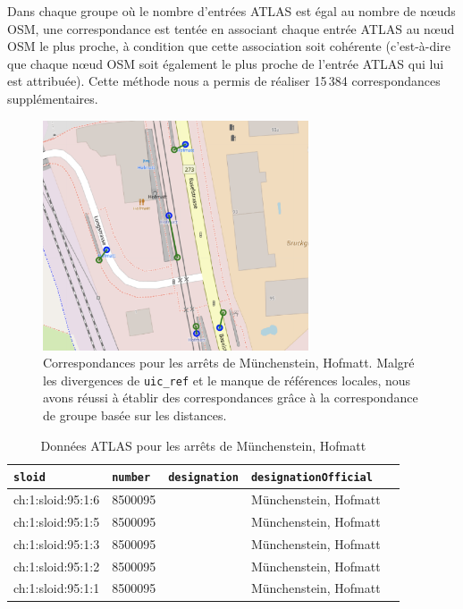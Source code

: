 Dans chaque groupe où le nombre d'entrées ATLAS est égal au nombre de nœuds OSM, une correspondance est tentée en associant chaque entrée ATLAS au nœud OSM le plus proche, à condition que cette association soit cohérente (c'est-à-dire que chaque nœud OSM soit également le plus proche de l'entrée ATLAS qui lui est attribuée). Cette méthode nous a permis de réaliser 15\,384 correspondances supplémentaires.

\begin{figure}[h] 
    \centering
    \includegraphics[width=0.7\textwidth]{../figures/correspondances/groupe_proximite.png}
    \caption[Correspondances – Münchenstein, Hofmatt]{Correspondances pour les arrêts de Münchenstein, Hofmatt. Malgré les divergences de \texttt{uic\_ref} et le manque de références locales, nous avons réussi à établir des correspondances grâce à la correspondance de groupe basée sur les distances.}
    \label{fig:group_proximity_munchenstein}
\end{figure}

\FloatBarrier

\begin{table}
\caption[Données ATLAS – Münchenstein, Hofmatt]{Données ATLAS pour les arrêts de Münchenstein, Hofmatt}
\label{tab:atlas_data}
\centering
\begin{tabular}{l l l l l}
\toprule
\texttt{sloid} & \texttt{number} & \texttt{designation} & \texttt{designationOfficial} \\
\midrule
ch:1:sloid:95:1:6 & 8500095 &  & Münchenstein, Hofmatt \\
ch:1:sloid:95:1:5 & 8500095 &  & Münchenstein, Hofmatt \\
ch:1:sloid:95:1:3 & 8500095 &  & Münchenstein, Hofmatt \\
ch:1:sloid:95:1:2 & 8500095 &  & Münchenstein, Hofmatt \\
ch:1:sloid:95:1:1 & 8500095 &  & Münchenstein, Hofmatt \\
\bottomrule
\end{tabular}
\end{table}

